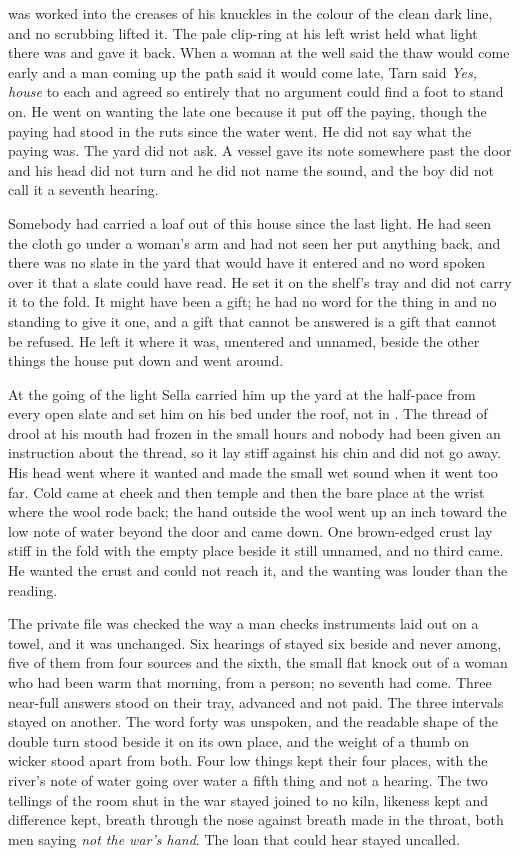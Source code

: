  was worked into the creases of his knuckles in the colour of the clean dark line, and no scrubbing lifted it. The pale clip-ring at his left wrist held what light there was and gave it back. When a woman at the well said the thaw would come early and a man coming up the path said it would come late, Tarn said \emph{Yes, house} to each and agreed so entirely that no argument could find a foot to stand on. He went on wanting the late one because it put off the paying, though the paying had stood in the ruts since the water went. He did not say what the paying was. The yard did not ask. A vessel gave its note somewhere past the door and his head did not turn and he did not name the sound, and the boy did not call it a seventh hearing.

Somebody had carried a loaf out of this house since the last light. He had seen the cloth go under a woman's arm and had not seen her put anything back, and there was no slate in the yard that would have it entered and no word spoken over it that a slate could have read. He set it on the shelf's tray and did not carry it to the fold. It might have been a gift; he had no word for the thing in  and no standing to give it one, and a gift that cannot be answered is a gift that cannot be refused. He left it where it was, unentered and unnamed, beside the other things the house put down and went around.

\scenebreak

At the going of the light Sella carried him up the yard at the half-pace from every open slate and set him on his bed under the roof, not in . The thread of drool at his mouth had frozen in the small hours and nobody had been given an instruction about the thread, so it lay stiff against his chin and did not go away. His head went where it wanted and made the small wet sound when it went too far. Cold came at cheek and then temple and then the bare place at the wrist where the wool rode back; the hand outside the wool went up an inch toward the low note of water beyond the door and came down. One brown-edged crust lay stiff in the fold with the empty place beside it still unnamed, and no third came. He wanted the crust and could not reach it, and the wanting was louder than the reading.

The private file was checked the way a man checks instruments laid out on a towel, and it was unchanged. Six hearings of  stayed six beside and never among, five of them from four sources and the sixth, the small flat knock out of a woman who had been warm that morning, from a person; no seventh had come. Three near-full answers stood on their tray, advanced and not paid. The three intervals stayed on another. The word forty was unspoken, and the readable shape of the double turn stood beside it on its own place, and the weight of a thumb on wicker stood apart from both. Four low things kept their four places, with the river's note of water going over water a fifth thing and not a hearing. The two tellings of the room shut in the war stayed joined to no kiln, likeness kept and difference kept, breath through the nose against breath made in the throat, both men saying \emph{not the war's hand}. The loan that could hear stayed uncalled.

